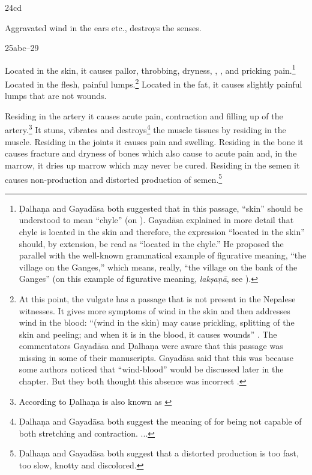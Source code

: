 \begin{translation}
\item[24cd]

	Aggravated wind in the ears etc., destroys the senses.


\item[25abc--29] 

Located in the skin, it causes pallor, throbbing, dryness,
, , and pricking
pain.\footnote{Ḍalhaṇa and Gayadāsa both suggested that in this
    passage,  “skin” should be understood to mean 
    “chyle” (on ). Gayadāsa explained in more detail that
    chyle is located in the skin and therefore, the expression
     “located in the skin” should, by extension, be read as
     “located in the chyle.”  He proposed the parallel with
    the well-known grammatical example of figurative meaning,
     “the village on the Ganges,” which means,
    really, “the village on the bank of the Ganges” (on this example of
    figurative meaning, \emph{lakṣaṇā}, see
    \cites[698--699]{jhal-1978}[ch.\,6]{kunj-1963}).} Located in the
    flesh, painful lumps.\footnote{At this point, the vulgate has a
        passage that is not present in the Nepalese witnesses.  It gives more
        symptoms of wind in the skin and then addresses wind in the blood:
        “(wind in the skin) may cause prickling, splitting of the skin and
        peeling; and when it is in the blood, it causes wounds”
        \citep[261]{vulgate}. The commentators Gayadāsa and Ḍalhaṇa were aware
        that this passage was missing in some of their manuscripts.  Gayadāsa
        said that this was because some authors noticed that 
        “wind-blood” would be discussed later in the chapter. But they both
        thought this absence was incorrect \citep[262]{vulgate}.} Located in
        the fat, it causes slightly painful lumps that are not wounds.

	Residing in the artery it causes acute pain, contraction and filling up
	of the artery.\footnote{According to Ḍalhaṇa  is also
	known as  \citep[262]{vulgate}} It stuns, vibrates and
	destroys\footnote{Ḍalhaṇa and Gayadāsa both suggest the meaning of
	 for being not capable of both stretching and contraction.
	\citep[262]{vulgate} ...} the muscle tissues by residing in the muscle.
	Residing in the joints it causes pain and swelling. Residing in the bone
	it causes fracture and dryness of bones which also cause to acute pain
	and, in the marrow, it dries up marrow which may never be cured.
	Residing in the semen it causes non-production and distorted production
	of semen.\footnote{Ḍalhaṇa and Gayadāsa both suggest that a distorted
	production  is too fast, too slow, knotty and
	discolored.} 



\end{translation}
